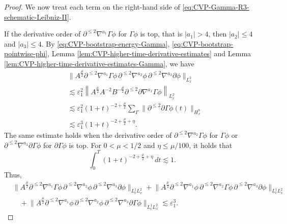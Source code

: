 \documentclass[11pt,twoside]{article}
\def\p{\partial}
\def\ve{\varepsilon}
\def\ls{\lesssim}
\theoremstyle{plain}
\theoremstyle{definition}
\theoremstyle{assumption}
\numberwithin{equation}{section}
\begin{document}
\begin{proof}
		
		We now treat each term on the right-hand side of \eqref{eq:CVP-Gamma-R3-schematic-Leibniz-II}.

If the derivative order of  $\p^{\le2}\nabla^{a_1}\Gamma\phi$ for $\Gamma\phi$ is top, that is $|a_1|>4$, then $|a_2|\le 4$ and $|a_3| \le 4$. By  \eqref{eq:CVP-bootstrap-energy-Gamma}, \eqref{eq:CVP-bootstrap-pointwise-phi},
Lemma \ref{lem:CVP-higher-time-derivative-estimates} and Lemma \ref{lem:CVP-higher-time-derivative-estimates-Gamma}, we have
		\begin{equation}
			\label{eq:CVP-Gamma-R3-high-Gamma-II}
			\begin{aligned}
				&
				\big\|
				A^{\frac{\mu}{2}}
				\p^{\le2}\nabla^{a_1}\Gamma\phi\,
				\p^{\le2}\nabla^{a_2}\phi\,
				\p^{\le2}\nabla^{a_3}\p\phi
				\big\|_{L^2_x}
				\\
				&\ls
				\ve_1^2
				\left\|
				A^{\frac{\mu}{2}}A^{-2}B^{-\frac{\mu}{2}}
				\p^{\le2}\p\nabla^{a_1}\Gamma\phi
				\right\|_{L^2_x}
				\\
				&\ls
				\ve_1^2
				(1+t)^{-2+\frac{\mu}{2}}
				\sum_{\Gamma}
				\|\p^{\le2}\p\Gamma\phi(t)\|_{H^{9}_x}
				\\
				&\ls
				\ve_1^3
				(1+t)^{-2+\frac{\mu}{2}+\eta}.
			\end{aligned}
		\end{equation}
		The same estimate holds when the derivative order of \(\p^{\le2}\nabla^{a_2}\Gamma\phi\) for $\Gamma\phi$ or
		\(\p^{\le2}\nabla^{a_3}\p\Gamma\phi\) for $\p\Gamma\phi$ is top. For \(0<\mu<1/2\) and \(\eta\le\mu/100\), it holds that
		\[
		\int_0^T
		(1+t)^{-2+\frac{\mu}{2}+\eta}\,dt
		\ls 1.
		\]
		Thus,
\begin{equation}\label{YHC-23}
\begin{aligned}
&\big\|A^{\frac{\mu}{2}}
\p^{\le2}\nabla^{a_1}\Gamma\phi\,
\p^{\le2}\nabla^{a_2}\phi\,
\p^{\le2}\nabla^{a_3}\p\phi
\big\|_{L_t^1L^2_x}
+\big\|A^{\frac{\mu}{2}}\p^{\le2}\nabla^{a_1}\phi\,
\p^{\le2}\nabla^{a_2}\Gamma\phi\,
\p^{\le2}\nabla^{a_3}\p\phi\big\|_{L_t^1L^2_x}\\
&\quad +\big\|A^{\frac{\mu}{2}}\p^{\le2}\nabla^{a_1}\phi\,
\p^{\le2}\nabla^{a_2}\phi\,
\p^{\le2}\nabla^{a_3}\p\Gamma\phi\|_{L_t^1L^2_x}\ls\ve_1^3.
\end{aligned}
		\end{equation}
		

\end{proof}
\end{document}
